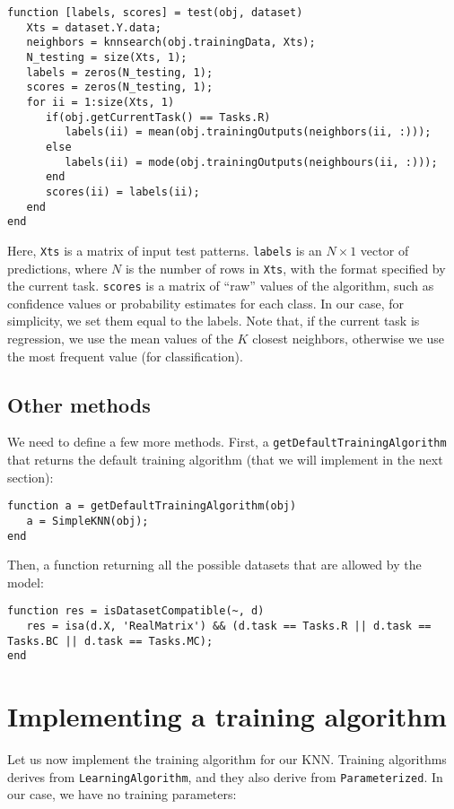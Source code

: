 \begin{lstlisting}
function [labels, scores] = test(obj, dataset)
   Xts = dataset.Y.data;
   neighbors = knnsearch(obj.trainingData, Xts);
   N_testing = size(Xts, 1);
   labels = zeros(N_testing, 1);
   scores = zeros(N_testing, 1);
   for ii = 1:size(Xts, 1)
      if(obj.getCurrentTask() == Tasks.R)
         labels(ii) = mean(obj.trainingOutputs(neighbors(ii, :)));
      else
         labels(ii) = mode(obj.trainingOutputs(neighbours(ii, :)));
      end
      scores(ii) = labels(ii);
   end
end
\end{lstlisting}

Here, \verb|Xts| is a matrix of input test patterns. \verb|labels| is an $N \times 1$ vector of predictions, where $N$ is the number of rows in \verb|Xts|, with the format specified by the current task. \verb|scores| is a matrix of ``raw'' values of the algorithm, such as confidence values or probability estimates for each class. In our case, for simplicity, we set them equal to the labels. Note that, if the current task is regression, we use the mean values of the $K$ closest neighbors, otherwise we use the most frequent value (for classification).

\subsection{Other methods}

We need to define a few more methods. First, a \verb|getDefaultTrainingAlgorithm| that returns the default training algorithm (that we will implement in the next section):

\begin{lstlisting}
function a = getDefaultTrainingAlgorithm(obj)
   a = SimpleKNN(obj);
end
\end{lstlisting}

\noindent Then, a function returning all the possible datasets that are allowed by the model:

\begin{lstlisting}
function res = isDatasetCompatible(~, d)
   res = isa(d.X, 'RealMatrix') && (d.task == Tasks.R || d.task == Tasks.BC || d.task == Tasks.MC);
end
\end{lstlisting}

\section{Implementing a training algorithm}

Let us now implement the training algorithm for our KNN. Training algorithms derives from \verb|LearningAlgorithm|, and they also derive from \verb|Parameterized|. In our case, we have no training parameters:

